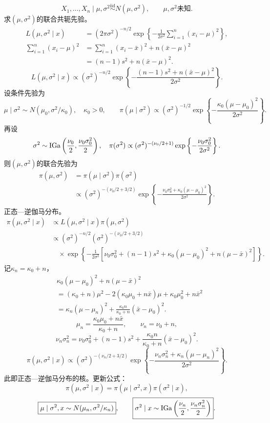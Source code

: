 \[
X_1,\ldots,X_n\mid\mu,\sigma^2
\overset{\mathrm{iid}}{\sim}N(\mu,\sigma^2),\qquad\mu,\sigma^2\text{未知}.
\]
求$(\mu,\sigma^2)$的联合共轭先验。
\begin{align*}
L(\mu,\sigma^2\mid x)
&=(2\pi\sigma^2)^{-n/2}
\exp\left\{-\frac1{2\sigma^2}\sum_{i=1}^n(x_i-\mu)^2\right\},\\
\sum_{i=1}^n(x_i-\mu)^2
&=\sum_{i=1}^n(x_i-\bar x)^2+n(\bar x-\mu)^2\\
&=(n-1)s^2+n(\bar x-\mu)^2.
\end{align*}
\[
L(\mu,\sigma^2\mid x)\propto
(\sigma^2)^{-n/2}\exp\left\{
-\frac{(n-1)s^2+n(\bar x-\mu)^2}{2\sigma^2}\right\}.
\]
设条件先验为
\[
\mu\mid\sigma^2\sim N(\mu_0,\sigma^2/\kappa_0),\quad\kappa_0>0,
\qquad
\pi(\mu\mid\sigma^2)\propto(\sigma^2)^{-1/2}
\exp\left\{-\frac{\kappa_0(\mu-\mu_0)^2}{2\sigma^2}\right\}.
\]
再设
\[
\sigma^2\sim\operatorname{IGa}\left(\frac{\nu_0}2,\frac{\nu_0\sigma_0^2}2\right),
\quad
\pi(\sigma^2)\propto(\sigma^2)^{-(\nu_0/2+1)}
\exp\left\{-\frac{\nu_0\sigma_0^2}{2\sigma^2}\right\}.
\]
则$(\mu,\sigma^2)$的联合先验为
\begin{align*}
\pi(\mu,\sigma^2)
&=\pi(\mu\mid\sigma^2)\pi(\sigma^2)\\
&\propto(\sigma^2)^{-(\nu_0/2+3/2)}
\exp\left\{-\frac{\nu_0\sigma_0^2+\kappa_0(\mu-\mu_0)^2}{2\sigma^2}\right\}.
\end{align*}
正态—逆伽马分布。
\begin{align*}
\pi(\mu,\sigma^2\mid x)
&\propto L(\mu,\sigma^2\mid x)\pi(\mu,\sigma^2)\\
&\propto(\sigma^2)^{-n/2}(\sigma^2)^{-(\nu_0/2+3/2)}\\
&\quad\times\exp\left\{-\frac1{2\sigma^2}
\left[\nu_0\sigma_0^2+(n-1)s^2
+\kappa_0(\mu-\mu_0)^2+n(\mu-\bar x)^2\right]\right\}.
\end{align*}
记$\kappa_n=\kappa_0+n$，
\begin{align*}
&\kappa_0(\mu-\mu_0)^2+n(\mu-\bar x)^2\\
&=(\kappa_0+n)\mu^2-2(\kappa_0\mu_0+n\bar x)\mu
+\kappa_0\mu_0^2+n\bar x^2\\
&=\kappa_n(\mu-\mu_n)^2
+\frac{\kappa_0n}{\kappa_0+n}(\bar x-\mu_0)^2.
\end{align*}
\[
\mu_n=\frac{\kappa_0\mu_0+n\bar x}{\kappa_0+n},\qquad\nu_n=\nu_0+n,
\]
\[
\nu_n\sigma_n^2=\nu_0\sigma_0^2+(n-1)s^2
+\frac{\kappa_0n}{\kappa_0+n}(\bar x-\mu_0)^2.
\]
\[
\pi(\mu,\sigma^2\mid x)\propto
(\sigma^2)^{-(\nu_n/2+3/2)}
\exp\left\{-\frac{\nu_n\sigma_n^2+\kappa_n(\mu-\mu_n)^2}{2\sigma^2}\right\}.
\]
此即正态—逆伽马分布的核。更新公式：
\[
\pi(\mu,\sigma^2\mid x)=\pi(\mu\mid\sigma^2,x)\pi(\sigma^2\mid x),
\]
\[
\boxed{\mu\mid\sigma^2,x\sim N(\mu_n,\sigma^2/\kappa_n)},\qquad
\boxed{\sigma^2\mid x\sim
\operatorname{IGa}\left(\frac{\nu_n}2,\frac{\nu_n\sigma_n^2}2\right)}.
\]
